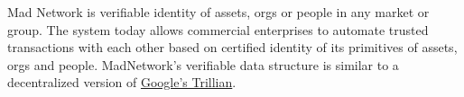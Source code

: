 Mad Network is verifiable identity of assets, orgs or people in any market
or group. The system today allows commercial enterprises to automate
trusted transactions with each other based on certified identity of its
primitives of assets, orgs and people.
MadNetwork's verifiable data structure is similar to a decentralized
version of
\href{https://github.com/google/trillian/blob/master/docs/papers/VerifiableDataStructures.pdf}{Google's Trillian}.
